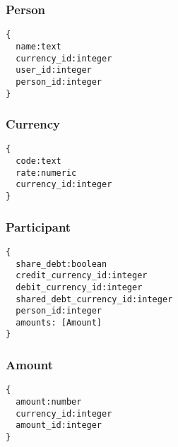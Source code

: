 \subsubsection{Person}
\begin{Verbatim}
{
  name:text
  currency_id:integer
  user_id:integer
  person_id:integer
}
\end{Verbatim}

\subsubsection{Currency}
\begin{Verbatim}
{
  code:text
  rate:numeric
  currency_id:integer
}
\end{Verbatim}

\subsubsection{Participant}
\begin{Verbatim}
{
  share_debt:boolean
  credit_currency_id:integer
  debit_currency_id:integer
  shared_debt_currency_id:integer
  person_id:integer
  amounts: [Amount]
}
\end{Verbatim}

\subsubsection{Amount}
\begin{Verbatim}
{
  amount:number
  currency_id:integer
  amount_id:integer
}
\end{Verbatim}
